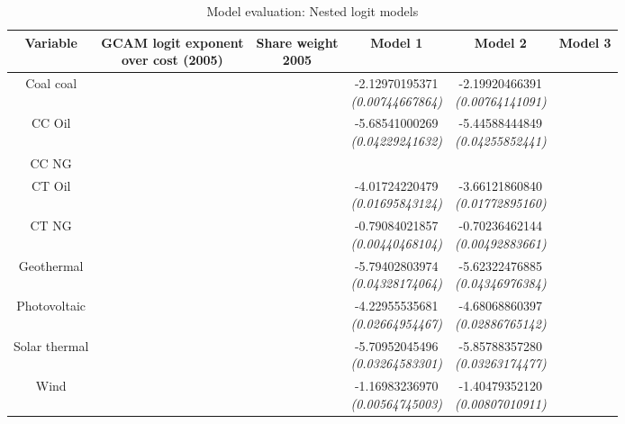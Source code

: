 \documentclass[10pt]{amsart}
\begin{document}
\begin{table}[H]
\caption{Model evaluation: Nested logit models}
\centering
\begin{tabular}{c c c c c c}
\hline
\hline
Variable & \makecell{GCAM logit exponent \\ over cost (2005)} & \makecell{Share weight \\ 2005} & Model 1 & Model 2 & Model 3\\ [0.5ex]
\hline
Coal coal & & & \makecell{-2.12970195371 \\ {\footnotesize\textit{(0.00744667864)}}} & \makecell{-2.19920466391 \\ {\footnotesize\textit{(0.00764141091)}}} & \\ 
CC Oil & & & \makecell{-5.68541000269 \\ {\footnotesize\textit{(0.04229241632)}}} & \makecell{-5.44588444849 \\ {\footnotesize\textit{(0.04255852441)}}} & \\
CC NG & & & & & \\
CT Oil & & & \makecell{-4.01724220479 \\ {\footnotesize\textit{(0.01695843124)}}} & \makecell{-3.66121860840 \\ {\footnotesize\textit{(0.01772895160)}}} & \\
CT NG & & & \makecell{-0.79084021857 \\ {\footnotesize\textit{(0.00440468104)}}} & \makecell{-0.70236462144 \\ {\footnotesize\textit{(0.00492883661)}}} & \\
Geothermal & & & \makecell{-5.79402803974 \\ {\footnotesize\textit{(0.04328174064)}}} & \makecell{-5.62322476885 \\ {\footnotesize\textit{(0.04346976384)}}} & \\
Photovoltaic & & & \makecell{-4.22955535681 \\ {\footnotesize\textit{(0.02664954467)}}} & \makecell{-4.68068860397 \\ {\footnotesize\textit{(0.02886765142)}}} & \\
Solar thermal & & & \makecell{-5.70952045496 \\ {\footnotesize\textit{(0.03264583301)}}} & \makecell{-5.85788357280 \\ {\footnotesize\textit{(0.03263174477)}}} & \\
Wind & & & \makecell{-1.16983236970 \\ {\footnotesize\textit{(0.00564745003)}}} & \makecell{-1.40479352120 \\ {\footnotesize\textit{(0.00807010911)}}} & \\

\end{tabular}
\end{table}
\end{document}
